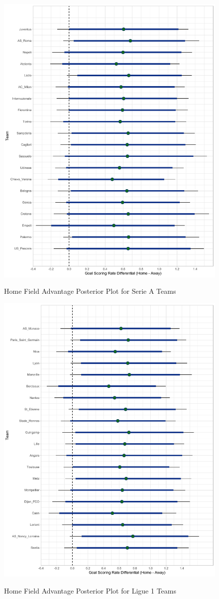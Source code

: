 \documentclass[USenglish]{article}
\begin{document}
\begin{figure}
\caption{Home Field Advantage Posterior Plot for Serie A Teams}
{\includegraphics[width=0.90\linewidth]{HFA_Serie_A11.pdf}}
\label{fig4}
\end{figure}

\begin{figure}
\caption{Home Field Advantage Posterior Plot for Ligue 1 Teams}
{\includegraphics[width=0.90\linewidth]{HFA_Ligue111.pdf}}
\label{fig5}
\end{figure}
\end{document}
